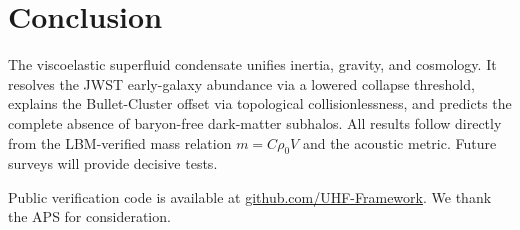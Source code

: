 \documentclass[reprint,amsmath,amssymb,aps,prl,superscriptaddress]{revtex4-2}
\begin{document}
\section{Conclusion}
\label{sec:conclusion}

The viscoelastic superfluid condensate unifies inertia, gravity, and cosmology. It resolves the JWST early-galaxy abundance via a lowered collapse threshold, explains the Bullet-Cluster offset via topological collisionlessness, and predicts the complete absence of baryon-free dark-matter subhalos. All results follow directly from the LBM-verified mass relation $m=C\rho_0V$ and the acoustic metric. Future surveys will provide decisive tests.

\begin{acknowledgments}
Public verification code is available at \href{https://github.com/UHF-Framework/verification-suite-v9.1}{github.com/UHF-Framework}. We thank the APS for consideration.
\end{acknowledgments}


\end{document}
